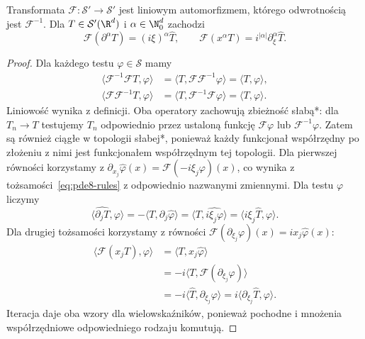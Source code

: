 \begin{twierdzenie}
\label{thm:pde8-dist-rules}
Transformata $\mathcal F:\mathcal S'\to\mathcal S'$ jest
liniowym automorfizmem, którego odwrotnością jest
$\mathcal F^{-1}$. Dla $T\in\mathcal S'(\R^d)$ i
$\alpha\in\N_0^d$ zachodzi
\[
 \mathcal F(\partial^\alpha T)=(i\xi)^\alpha\widehat T,
 \qquad \mathcal F(x^\alpha T)=i^{|\alpha|}
 \partial_\xi^\alpha\widehat T.
\]
\end{twierdzenie}
\begin{proof}
Dla każdego testu $\varphi\in\mathcal S$ mamy
\[
 \begin{aligned}
 \langle\mathcal F^{-1}\mathcal FT,\varphi\rangle
 &=\langle T,\mathcal F\mathcal F^{-1}\varphi\rangle
 =\langle T,\varphi\rangle,\\
 \langle\mathcal F\mathcal F^{-1}T,\varphi\rangle
 &=\langle T,\mathcal F^{-1}\mathcal F\varphi\rangle
 =\langle T,\varphi\rangle.
 \end{aligned}
\]
Liniowość wynika z definicji. Oba operatory
zachowują zbieżność słabą*: dla $T_n\to T$
testujemy $T_n$ odpowiednio przez ustaloną
funkcję $\mathcal F\varphi$ lub $\mathcal F^{-1}\varphi$.
Zatem są również ciągłe w topologii słabej*,
ponieważ każdy funkcjonał współrzędny po złożeniu
z nimi jest funkcjonałem współrzędnym tej topologii.
Dla pierwszej równości korzystamy z
$\partial_{x_j}\widehat\varphi(x)
=\mathcal F(-i\xi_j\varphi)(x)$,
co wynika z tożsamości~\eqref{eq:pde8-rules}
z odpowiednio nazwanymi zmiennymi.
Dla testu $\varphi$ liczymy
\[
 \langle\widehat{\partial_jT},\varphi\rangle
 =-\langle T,\partial_j\widehat\varphi\rangle
 =\langle T,\widehat{i\xi_j\varphi}\rangle
 =\langle i\xi_j\widehat T,\varphi\rangle.
\]
Dla drugiej tożsamości korzystamy z równości
$\mathcal F(\partial_{\xi_j}\varphi)(x)
=ix_j\widehat\varphi(x)$:
\[
 \begin{aligned}
 \langle\mathcal F(x_jT),\varphi\rangle
 &=\langle T,x_j\widehat\varphi\rangle\\
 &=-i\langle T,\mathcal F(\partial_{\xi_j}\varphi)\rangle\\
 &=-i\langle\widehat T,\partial_{\xi_j}\varphi\rangle
 =i\langle\partial_{\xi_j}\widehat T,\varphi\rangle.
 \end{aligned}
\]
Iteracja daje oba wzory dla wielowskaźników,
ponieważ pochodne i mnożenia współrzędniowe
odpowiedniego rodzaju komutują.
\end{proof}

